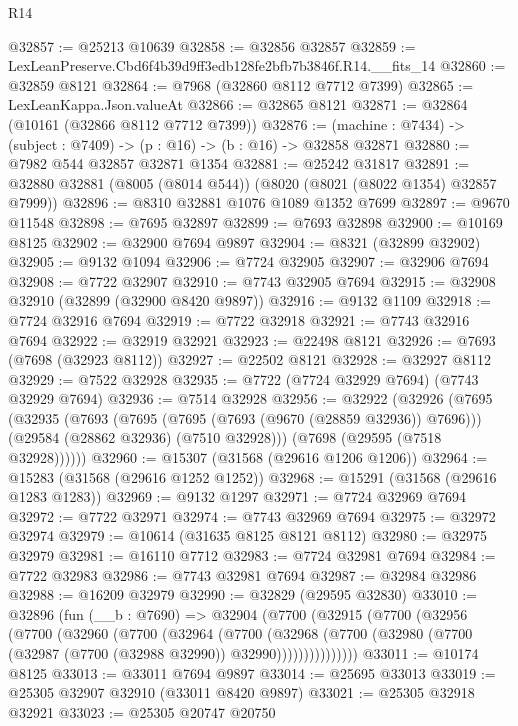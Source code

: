 \begin{lexlean}{R14}
\begin{coremodule}
@32857 := @25213 @10639
@32858 := @32856 @32857
@32859 := LexLeanPreserve.Cbd6f4b39d9ff3edb128fe2bfb7b3846f.R14.__fits_14
@32860 := @32859 @8121
@32864 := @7968 (@32860 @8112 @7712 @7399)
@32865 := LexLeanKappa.Json.valueAt
@32866 := @32865 @8121
@32871 := @32864 (@10161 (@32866 @8112 @7712 @7399))
@32876 := (machine : @7434) -> (subject : @7409) -> (p : @16) -> (b : @16) -> @32858 @32871
@32880 := @7982 @544 @32857 @32871 @1354
@32881 := @25242 @31817
@32891 := @32880 @32881 (@8005 (@8014 @544)) (@8020 (@8021 (@8022 @1354) @32857 @7999))
@32896 := @8310 @32881 @1076 @1089 @1352 @7699
@32897 := @9670 @11548
@32898 := @7695 @32897
@32899 := @7693 @32898
@32900 := @10169 @8125
@32902 := @32900 @7694 @9897
@32904 := @8321 (@32899 @32902)
@32905 := @9132 @1094
@32906 := @7724 @32905
@32907 := @32906 @7694
@32908 := @7722 @32907
@32910 := @7743 @32905 @7694
@32915 := @32908 @32910 (@32899 (@32900 @8420 @9897))
@32916 := @9132 @1109
@32918 := @7724 @32916 @7694
@32919 := @7722 @32918
@32921 := @7743 @32916 @7694
@32922 := @32919 @32921
@32923 := @22498 @8121
@32926 := @7693 (@7698 (@32923 @8112))
@32927 := @22502 @8121
@32928 := @32927 @8112
@32929 := @7522 @32928
@32935 := @7722 (@7724 @32929 @7694) (@7743 @32929 @7694)
@32936 := @7514 @32928
@32956 := @32922
    (@32926
      (@7695
        (@32935
          (@7693
            (@7695 (@7695 (@7693 (@9670 (@28859 @32936)) @7696)))
            (@29584 (@28862 @32936) (@7510 @32928)))
          (@7698 (@29595 (@7518 @32928))))))
@32960 := @15307 (@31568 (@29616 @1206 @1206))
@32964 := @15283 (@31568 (@29616 @1252 @1252))
@32968 := @15291 (@31568 (@29616 @1283 @1283))
@32969 := @9132 @1297
@32971 := @7724 @32969 @7694
@32972 := @7722 @32971
@32974 := @7743 @32969 @7694
@32975 := @32972 @32974
@32979 := @10614 (@31635 @8125 @8121 @8112)
@32980 := @32975 @32979
@32981 := @16110 @7712
@32983 := @7724 @32981 @7694
@32984 := @7722 @32983
@32986 := @7743 @32981 @7694
@32987 := @32984 @32986
@32988 := @16209 @32979
@32990 := @32829 (@29595 @32830)
@33010 := @32896
    (fun (__b : @7690) =>
    @32904
      (@7700
        (@32915
          (@7700
            (@32956
              (@7700
                (@32960
                  (@7700
                    (@32964
                      (@7700
                        (@32968
                          (@7700
                            (@32980 (@7700 (@32987 (@7700 (@32988 @32990)) @32990)))))))))))))))
@33011 := @10174 @8125
@33013 := @33011 @7694 @9897
@33014 := @25695 @33013
@33019 := @25305 @32907 @32910 (@33011 @8420 @9897)
@33021 := @25305 @32918 @32921
@33023 := @25305 @20747 @20750

\end{coremodule}
\end{lexlean}
